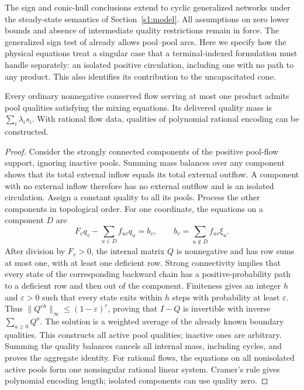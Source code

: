 The sign and conic-hull conclusions extend to cyclic generalized
networks under the steady-state semantics of
Section~\ref{s1:model}. All assumptions on zero lower bounds and
absence of intermediate quality restrictions remain in force.
The generalized sign test of \citet{xiang2026-dive-and-fix} already
allows pool--pool arcs. Here we specify how the physical equations
treat a singular case that a terminal-indexed formulation must handle
separately: an isolated positive circulation, including one with no
path to any product. This also identifies its contribution to the
uncapacitated cone.

\begin{lemma}\label{s1:cyclic-single}
Every ordinary nonnegative conserved flow serving at most one product
admits pool qualities satisfying the mixing equations. Its delivered
quality mass is $\sum_i\lambda_is_i$. With rational flow data,
qualities of polynomial rational encoding can be constructed.
\end{lemma}
\begin{proof}
Consider the strongly connected components of the positive pool-flow
support, ignoring inactive pools. Summing mass balances over any
component shows that its total external inflow equals its total external
outflow. A component with no external inflow therefore has no external
outflow and is an isolated circulation. Assign a constant quality to
all its pools. Process the other components in topological order.
For one coordinate, the equations on a component $D$ are
\[
 F_vq_v-\sum_{u\in D}f_{uv}q_u=b_v,\qquad
 b_v=\sum_{u\notin D}f_{uv}\xi_u.
\]
After division by $F_v>0$, the internal matrix $Q$ is nonnegative and
has row sums at most one, with at least one deficient row. Strong
connectivity implies that every state of the corresponding backward
chain has a positive-probability path to a deficient row and then out
of the component. Finiteness gives an integer $h$ and $\varepsilon>0$
such that every state exits within $h$ steps with probability at least
$\varepsilon$. Thus $\|Q^{rh}\|_\infty\le(1-\varepsilon)^r$, proving
that $I-Q$ is invertible with inverse $\sum_{a\ge0}Q^a$.
The solution is a weighted average of the already known boundary
qualities. This constructs all active pool qualities; inactive ones
are arbitrary. Summing the quality balances cancels all internal mass,
including cycles, and proves the aggregate identity.
For rational flows, the equations on all nonisolated active pools form
one nonsingular rational linear system. Cramer's rule gives polynomial
encoding length; isolated components can use quality zero.
\end{proof}

